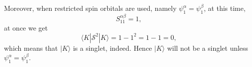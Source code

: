 \documentclass[a4paper]{book}
\newcounter{solution}[chapter]
\begin{document}
\begin{solution}
\begin{itemize}
	Moreover, when restricted spin orbitals are used, namely $\psi^\alpha_1 = \psi^\beta_1$, at this time,
	\[
		S^{\alpha\beta}_{11} = 1,
	\]	
	at once we get
	\[
		\langle K | \mathscr{S}^2 | K \rangle = 1 - 1^2 = 1 - 1 = 0 ,
	\]
	which means that $| K \rangle $ is a singlet, indeed. Hence $| K \rangle$ will not be a singlet unless $\psi^\alpha_1 = \psi^\beta_1$.
	
	\end{itemize}
	
	\end{solution}
\end{document}
